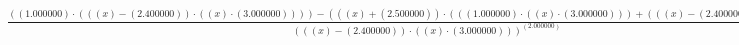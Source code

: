 \documentclass{article}
\begin{document}
$\frac{((1.000000)\cdot(((x)-(2.400000))\cdot((x)\cdot(3.000000))))-(((x)+(2.500000))\cdot(((1.000000)\cdot((x)\cdot(3.000000)))+(((x)-(2.400000))\cdot(3.000000))))}{(((x)-(2.400000))\cdot((x)\cdot(3.000000)))^(2.000000)}$
\end{document}
